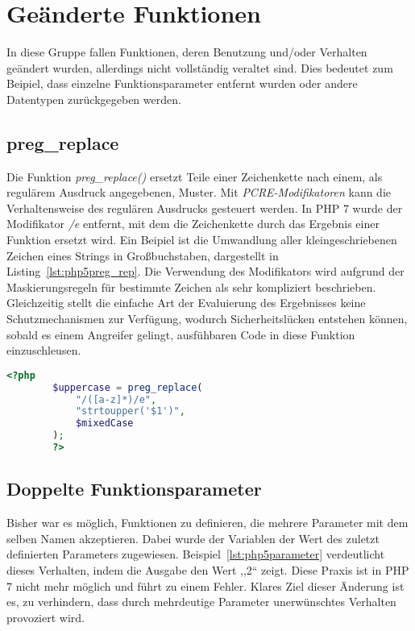 \section{Geänderte Funktionen}
In diese Gruppe fallen Funktionen, deren Benutzung und/oder Verhalten geändert wurden, allerdings nicht vollständig veraltet sind. Dies bedeutet zum Beipiel, dass 
einzelne Funktionsparameter entfernt wurden oder andere Datentypen zurückgegeben werden.
    \subsection{preg\_replace} \label{preg_replace}
    Die Funktion \textit{preg\_replace()} ersetzt Teile einer Zeichenkette nach einem, als regulärem Ausdruck angegebenen, Muster. Mit \textit{\acs{PCRE}-Modifikatoren} 
    kann die Verhaltensweise des regulären Ausdrucks gesteuert werden. In \acs{PHP} 7 wurde der Modifikator \textit{/e} entfernt, mit dem die Zeichenkette durch das Ergebnis
    einer Funktion ersetzt wird. Ein Beipiel ist die Umwandlung aller kleingeschriebenen Zeichen eines Strings in Großbuchstaben, dargestellt in Listing~\ref{lst:php5preg_rep}. Die Verwendung
    des Modifikators wird aufgrund der Maskierungsregeln für bestimmte Zeichen als sehr kompliziert beschrieben. Gleichzeitig stellt die einfache Art der Evaluierung
    des Ergebnisses keine Schutzmechanismen zur Verfügung, wodurch Sicherheitslücken entstehen können, sobald es einem Angreifer gelingt, ausfühbaren Code in diese
    Funktion einzuschleusen. 

    \begin{lstlisting}[language=php, caption={Beispiel der Nutzung von preg\_replace mit dem Modifikator /e}, label={lst:php5preg_rep}]
        <?php
        $uppercase = preg_replace(
            "/([a-z]*)/e",
            "strtoupper('$1')",
            $mixedCase
        );
        ?>
    \end{lstlisting}
    
    \subsection{Doppelte Funktionsparameter}\label{php5double}
    Bisher war es möglich, Funktionen zu definieren, die mehrere Parameter mit dem selben Namen akzeptieren. Dabei wurde der 
    Variablen der Wert des zuletzt definierten Parameters zugewiesen. Beispiel~\ref{lst:php5parameter} verdeutlicht dieses 
    Verhalten, indem die Ausgabe den Wert ,,2`` zeigt. Diese Praxis ist in \ac{PHP} 7 nicht mehr möglich und 
    führt zu einem Fehler. Klares Ziel dieser Änderung ist es, zu verhindern, dass durch mehrdeutige Parameter unerwünschtes 
    Verhalten provoziert wird.

